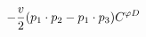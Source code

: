 %
\begin{dmath*}
%
  -  \frac{v}{2}(p_{1}\nobreak\cdot\nobreak{}p_{2} - p_{1}\nobreak\cdot\nobreak{}p_{3}) C^{ \varphi  D}
%
\end{dmath*}
%
